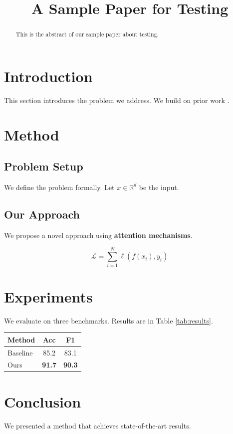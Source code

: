 \documentclass{article}
\begin{document}
\title{A Sample Paper for Testing}
\maketitle

\begin{abstract}
This is the abstract of our sample paper about testing.
\end{abstract}

\section{Introduction}
This section introduces the problem we address. We build on prior work \cite{smith2024}.

\section{Method}
\subsection{Problem Setup}
We define the problem formally. Let $x \in \mathbb{R}^d$ be the input.

\subsection{Our Approach}
We propose a novel approach using \textbf{attention mechanisms}.

\begin{equation}
\mathcal{L} = \sum_{i=1}^{N} \ell(f(x_i), y_i)
\end{equation}

\section{Experiments}
We evaluate on three benchmarks. Results are in Table \ref{tab:results}.

\begin{table}[h]
\begin{tabular}{lcc}
Method & Acc & F1 \\
\hline
Baseline & 85.2 & 83.1 \\
Ours & \textbf{91.7} & \textbf{90.3} \\
\end{tabular}
\end{table}

\section{Conclusion}
We presented a method that achieves state-of-the-art results.
\end{document}
